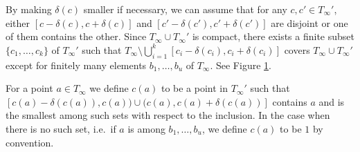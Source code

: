 \documentclass{amsart}
\theoremstyle{definition}
\numberwithin{figure}{section}
\numberwithin{equation}{section}
\newcommand{\ie}{i.e.\ }
\def\Sg{\Sigma}
\def\Sg{\Sigma}
\begin{document}
\smallskip

By making $\delta(c)$ smaller if necessary, 
we can assume 
that  for any $c,c'
\in T_\infty'$, either $[c-\delta(c),c+\delta(c)]$ 
and $[c'-\delta(c'),c'+\delta(c')]$ are  disjoint or one of them contains the other.
Since $T_\infty\cup T_\infty'$ is compact, there exists a finite subset $\{c_1,\dots,c_k\}$ of 
$T_\infty'$ such that $T_\infty\setminus \bigcup_{i=1}^k[c_i-\delta(c_i),c_i+\delta(c_i)]$ covers $T_\infty \cup T_\infty'$ except for finitely many elements $b_1,\dots,b_u$ of $T_\infty$.
See Figure \ref{fig2_4}.

For a point $a \in T_\infty$ we define $c(a)$ to be a point in $T_\infty'$ such that $[c(a)-\delta(c(a)), c(a)) \cup (c(a), c(a)+\delta(c(a))]$ contains $a$ and is the smallest among such sets with respect to the inclusion.
In the case when there is no such set, \ie if $a$ is among $b_1, \dots, b_u$,  we define $c(a)$ to be $1$ by convention.

\begin{figure}[hbtp]
\centering
{}
\caption{}
\label{fig2_4}
\end{figure}
\end{document}
